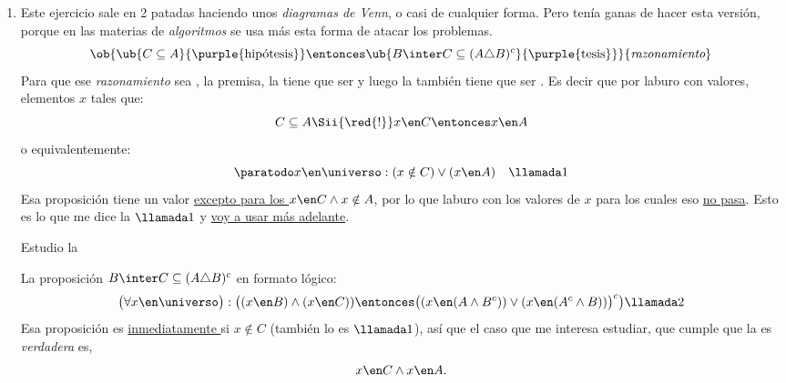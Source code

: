 \begin{enumerate}[label=\roman*)]
  \item Este ejercicio sale en 2 patadas haciendo unos \textit{diagramas de Venn}, o casi de cualquier forma. Pero tenía ganas de hacer esta versión,
        porque en las materias de \textit{algoritmos} se usa más esta forma de atacar los problemas.
        $$
          \ob{
            \ub{
              C \subseteq A
            }{
              \text{\purple{hipótesis}}
            }
            \entonces
            \ub{
              B \inter C \subseteq (A \triangle B)^c
            }{
              \text{\purple{tesis}}
            }
          }{
            \textit{razonamiento}
          }
        $$
        Para que ese \textit{razonamiento} sea , la premisa, la  tiene que ser  y luego
        la  también tiene que ser .
        Es decir que por  laburo con valores, elementos $x$ tales que:
        $$
          C \subseteq A
          \Sii{\red{!}}
          x \en C \entonces x \en A
        $$
        o equivalentemente:
        $$
          \paratodo x \en \universo : (x \notin C) \lor (x \en A) \quad \llamada1
        $$
        Esa proposición tiene un valor  \ul{excepto para los $x \en C \land x \notin A$},
        por lo que laburo con los valores de $x$ para los cuales eso \ul{no pasa}.
        Esto es lo que me dice la  $\llamada1$ y \ul{voy a usar más adelante}.

        \bigskip

        Estudio la 

        La proposición $B \inter C \subseteq (A \triangle B)^c$ en formato lógico:
        $$
          \big(
          \forall x \en \universo
          \big):
          \big(
          (x \en B) \land (x \en C)
          )
          \entonces
          \big(
          (x \en (A \land B^c) ) \lor  (x \en ( A^c \land B))
          \big)^c
          \big) \llamada2
        $$
        Esa proposición es \underline{inmediatamente } si $x \notin C$ (también lo es $\llamada1$), así que el caso que me interesa estudiar,
        que cumple que la  es \textit{verdadera} es,
        $$
          x \en C \land x \en A.
        $$


\end{enumerate}
